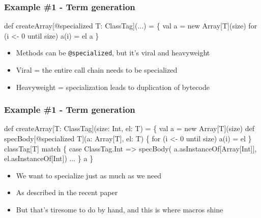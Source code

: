 \documentclass[svgnames,hyperref={bookmarks=false}]{beamer}
\begin{document}
\begin{frame}[fragile]
\frametitle{Example \#1 - Term generation}

\begin{semiverbatim}
def createArray[@specialized T: ClassTag](...) = \{
  val a = new Array[T](size)
  for (i <- 0 until size) a(i) = el
  a
\}

\end{semiverbatim}

\begin{itemize}
\item Methods can be \texttt{@specialized}, but it's viral and heavyweight
\item Viral = the entire call chain needs to be specialized
\item Heavyweight = specialization leads to duplication of bytecode
\end{itemize}
\end{frame}

\begin{frame}[fragile]
\frametitle{Example \#1 - Term generation}

\begin{semiverbatim}
def createArray[T: ClassTag](size: Int, el: T) = \{
  val a = new Array[T](size)
  def specBody[@specialized T](a: Array[T], el: T) \{
    for (i <- 0 until size) a(i) = el
  \}
  classTag[T] match \{
    case ClassTag.Int => specBody(
      a.asInstanceOf[Array[Int]], el.asInstanceOf[Int])
    ...
  \}
  a
\}
\end{semiverbatim}

\begin{itemize}
\item We want to specialize just as much as we need
\item As described in the recent  paper
\item But that's tiresome to do by hand, and this is where macros shine
\end{itemize}
\end{frame}
\end{document}
